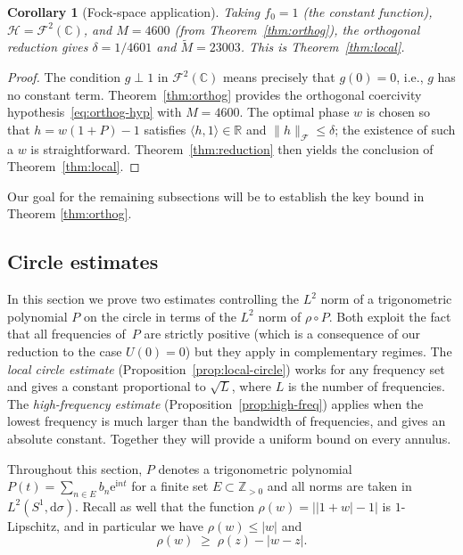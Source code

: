 \documentclass[11pt]{amsart}
\newtheorem{corollary}[theorem]{Corollary}
\theoremstyle{remark}
\begin{document}
\begin{corollary}[Fock-space application]\label{cor:fock-local}
Taking $f_0 = 1$ (the constant function), $\mathcal{H} = \mathcal{F}^2(\mathbb{C})$, and
$M = 4600$ (from Theorem~\ref{thm:orthog}), the orthogonal reduction gives
$\delta = 1/4601$ and $\widetilde{M} = 23003$.
This is Theorem~\ref{thm:local}.
\end{corollary}

\begin{proof}
The condition $g \perp 1$ in $\mathcal{F}^2(\mathbb{C})$ means precisely that
$g(0) = 0$, i.e., $g$ has no constant term.
Theorem~\ref{thm:orthog} provides the orthogonal coercivity
hypothesis~\eqref{eq:orthog-hyp} with $M = 4600$.
The optimal phase $w$ is chosen so that
$h = w(1 + P) - 1$ satisfies $\langle h,1\rangle \in \mathbb{R}$ and
$\lVert h \rVert_{\mathcal{F}} \le \delta$; the existence of such a $w$ is straightforward.
Theorem~\ref{thm:reduction} then yields the conclusion of
Theorem~\ref{thm:local}. 
\end{proof}
Our goal for the remaining subsections will  be to establish the key bound in Theorem  \ref{thm:orthog}.
 \subsection{Circle estimates}\label{subsec:circle}

In this section we prove two estimates controlling the $L^2$ norm of a
trigonometric polynomial $P$ on the circle in terms of the $L^2$ norm of
$\rho \circ P$.  Both exploit the fact that all frequencies of~$P$ are
strictly positive (which is a consequence of our reduction to the case $U(0)=0$) but they apply in
complementary regimes.  The \emph{local circle estimate}
(Proposition~\ref{prop:local-circle}) works for any frequency set and gives a
constant proportional to $\sqrt{L}$, where $L$ is the number of frequencies.
The \emph{high-frequency estimate} (Proposition~\ref{prop:high-freq}) applies
when the lowest frequency is much larger than the bandwidth of frequencies, and gives an
absolute constant. Together they will provide a uniform bound on every
annulus.
\medskip

Throughout this section, $P$ denotes a trigonometric polynomial
$P(t) = \sum_{n \in E} b_n \mathrm{e}^{\mathrm{i} nt}$ for a finite set $E \subset \mathbb{Z}_{>0}$ 
and all norms are taken in $L^2(S^1, \mathrm{d}\sigma)$. Recall as well that the function $\rho(w) = \bigl\lvert \lvert 1+w \rvert - 1 \bigr\rvert$
 is $1$-Lipschitz, and in particular we have $\rho(w) \le \lvert w \rvert$ and
\begin{equation}\label{eq:rho-lip}
\rho(w) \;\ge\; \rho(z) - \lvert w - z \rvert.
\end{equation}
\end{document}

